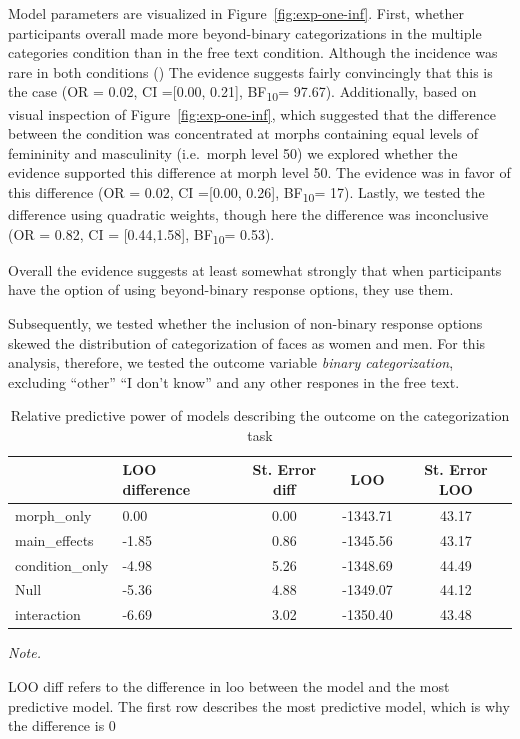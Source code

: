 \documentclass[
  man]{apa7}
\begin{document}
Model parameters are visualized in Figure~\ref{fig:exp-one-inf}. First, whether participants overall made more beyond-binary categorizations in the multiple categories condition than in the free text condition. Although the incidence was rare in both conditions () The evidence suggests fairly convincingly that this is the case (OR = 0.02, CI ={[}0.00, 0.21{]}, BF\textsubscript{10}= 97.67). Additionally, based on visual inspection of Figure~\ref{fig:exp-one-inf}, which suggested that the difference between the condition was concentrated at morphs containing equal levels of femininity and masculinity (i.e.~morph level 50) we explored whether the evidence supported this difference at morph level 50. The evidence was in favor of this difference (OR = 0.02, CI ={[}0.00, 0.26{]}, BF\textsubscript{10}= 17). Lastly, we tested the difference using quadratic weights, though here the difference was inconclusive (OR = 0.82, CI = {[}0.44,1.58{]}, BF\textsubscript{10}= 0.53).

Overall the evidence suggests at least somewhat strongly that when participants have the option of using beyond-binary response options, they use them.

Subsequently, we tested whether the inclusion of non-binary response options skewed the distribution of categorization of faces as women and men. For this analysis, therefore, we tested the outcome variable \emph{binary categorization}, excluding ``other'' ``I don't know'' and any other respones in the free text.

\begin{table}

\caption{\label{tab:rq2-table}Relative predictive power of models describing the outcome on the categorization task}
\centering
\begin{threeparttable}
\begin{tabular}[t]{llccc}
\toprule
  & LOO difference & St. Error diff & LOO & St. Error LOO\\
\midrule
morph\_only & 0.00 & 0.00 & -1343.71 & 43.17\\
main\_effects & -1.85 & 0.86 & -1345.56 & 43.17\\
condition\_only & -4.98 & 5.26 & -1348.69 & 44.49\\
Null & -5.36 & 4.88 & -1349.07 & 44.12\\
interaction & -6.69 & 3.02 & -1350.40 & 43.48\\
\bottomrule
\end{tabular}
\begin{tablenotes}[para]
\item \textit{Note.} 
\item LOO diff refers to the difference in loo between the model and the most predictive model. The first row describes the most predictive model, which is why the difference is 0
\end{tablenotes}
\end{threeparttable}
\end{table}
\end{document}

